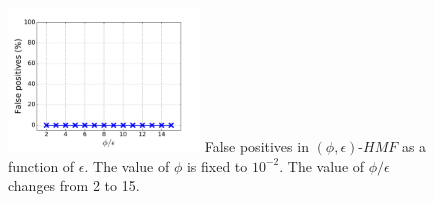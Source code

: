 
\begin{figure}[t!]
\begin{center}
\includegraphics[width=2.0in]{figure/fp}
{False positives in $(\phi, \epsilon)\mbox{-}HMF$ as a function of $\epsilon$. The value of $\phi$ is fixed to $10^{-2}$.
The value of $\phi/\epsilon$ changes from 2 to 15.}
\end{center}
\end{figure}